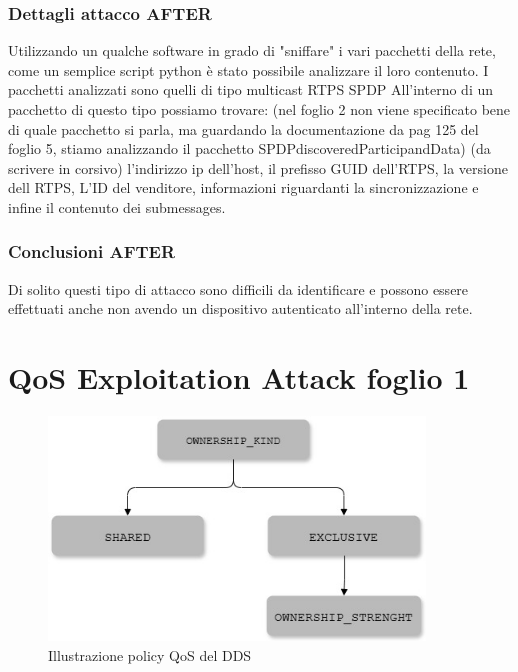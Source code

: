 \subsubsection{Dettagli attacco AFTER}
Utilizzando un qualche software in grado di "sniffare" i vari pacchetti della
rete, come un semplice script python è stato possibile analizzare il loro
contenuto. I pacchetti analizzati sono quelli di tipo multicast RTPS SPDP
All'interno di un pacchetto di questo tipo possiamo trovare: (nel foglio 2
non viene specificato bene di quale pacchetto si parla, ma guardando la documentazione
da pag 125 del foglio 5, stiamo analizzando il pacchetto SPDPdiscoveredParticipandData)
(da scrivere in corsivo) l'indirizzo ip dell'host, il prefisso GUID dell'RTPS,
la versione dell RTPS, L'ID del venditore, informazioni riguardanti la sincronizzazione
e infine il contenuto dei submessages.




\subsubsection{Conclusioni AFTER}
Di solito questi tipo di attacco sono difficili da identificare e possono essere
effettuati anche non avendo un dispositivo autenticato all'interno della rete.


\section{QoS Exploitation Attack foglio 1}


%     




\begin{figure}[H]
    \centering
    \includegraphics[width=10cm, keepaspectratio]{img/Policy QoS DDS_2.jpg}
    \caption{Illustrazione policy QoS del DDS}\label{Mappa QoS}
\end{figure}


